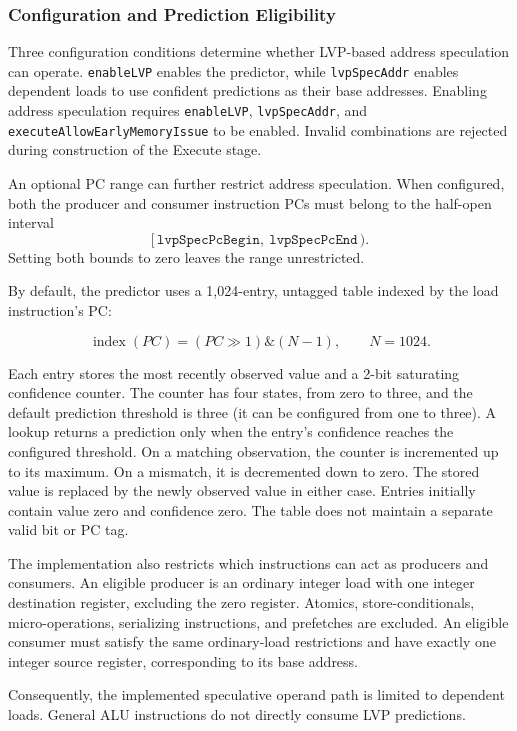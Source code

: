 \subsubsection{Configuration and Prediction Eligibility}

Three configuration conditions determine whether LVP-based address speculation can operate. \texttt{enableLVP} enables the predictor, while
\texttt{lvpSpecAddr} enables dependent loads to use confident
predictions as their base addresses. Enabling address speculation
requires \texttt{enableLVP}, \texttt{lvpSpecAddr}, and
\texttt{executeAllowEarlyMemoryIssue} to be enabled. Invalid
combinations are rejected during construction of the Execute stage.

An optional PC range can further restrict address speculation.
When configured, both the producer and consumer instruction PCs must
belong to the half-open interval
\[
    [\,\texttt{lvpSpecPcBegin},\ \texttt{lvpSpecPcEnd}\,).
\]
Setting both bounds to zero leaves the range unrestricted.

By default, the predictor uses a 1,024-entry, untagged table
indexed by the load instruction's PC:

\[
    \operatorname{index}(PC)
    = (PC \gg 1) \mathbin{\&} (N-1),
    \qquad N=1024.
\]

Each entry stores the most recently observed value and a 2-bit
saturating confidence counter. The counter has four states, from
zero to three, and the default prediction threshold is three (it
can be configured from one to three). A lookup returns a prediction
only when the entry's confidence reaches the configured threshold.
On a matching observation, the counter is incremented up to its
maximum. On a mismatch, it is decremented down to zero. The stored
value is replaced by the newly observed value in either case.
Entries initially contain value zero and confidence zero. The table
does not maintain a separate valid bit or PC tag.

The implementation also restricts which instructions can act as
producers and consumers. An eligible producer is an ordinary integer
load with one integer destination register, excluding the zero
register. Atomics, store-conditionals, micro-operations, serializing
instructions, and prefetches are excluded. An eligible consumer must
satisfy the same ordinary-load restrictions and have exactly one
integer source register, corresponding to its base address.

Consequently, the implemented speculative operand path is limited to
dependent loads. General ALU instructions do not directly consume
LVP predictions.



